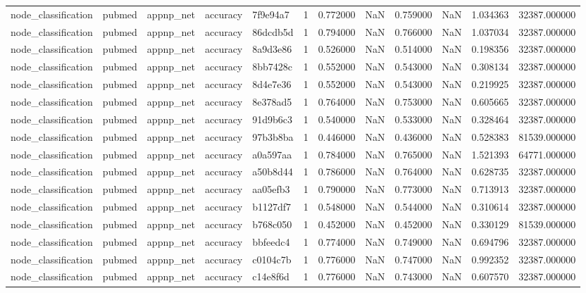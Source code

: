 \begin{tabular}{lllllrrrrrrr}
node_classification & pubmed & appnp_net & accuracy & 7f9e94a7 & 1 & 0.772000 & NaN & 0.759000 & NaN & 1.034363 & 32387.000000 \\
node_classification & pubmed & appnp_net & accuracy & 86dcdb5d & 1 & 0.794000 & NaN & 0.766000 & NaN & 1.037034 & 32387.000000 \\
node_classification & pubmed & appnp_net & accuracy & 8a9d3e86 & 1 & 0.526000 & NaN & 0.514000 & NaN & 0.198356 & 32387.000000 \\
node_classification & pubmed & appnp_net & accuracy & 8bb7428c & 1 & 0.552000 & NaN & 0.543000 & NaN & 0.308134 & 32387.000000 \\
node_classification & pubmed & appnp_net & accuracy & 8d4e7e36 & 1 & 0.552000 & NaN & 0.543000 & NaN & 0.219925 & 32387.000000 \\
node_classification & pubmed & appnp_net & accuracy & 8e378ad5 & 1 & 0.764000 & NaN & 0.753000 & NaN & 0.605665 & 32387.000000 \\
node_classification & pubmed & appnp_net & accuracy & 91d9b6c3 & 1 & 0.540000 & NaN & 0.533000 & NaN & 0.328464 & 32387.000000 \\
node_classification & pubmed & appnp_net & accuracy & 97b3b8ba & 1 & 0.446000 & NaN & 0.436000 & NaN & 0.528383 & 81539.000000 \\
node_classification & pubmed & appnp_net & accuracy & a0a597aa & 1 & 0.784000 & NaN & 0.765000 & NaN & 1.521393 & 64771.000000 \\
node_classification & pubmed & appnp_net & accuracy & a50b8d44 & 1 & 0.786000 & NaN & 0.764000 & NaN & 0.628735 & 32387.000000 \\
node_classification & pubmed & appnp_net & accuracy & aa05efb3 & 1 & 0.790000 & NaN & 0.773000 & NaN & 0.713913 & 32387.000000 \\
node_classification & pubmed & appnp_net & accuracy & b1127df7 & 1 & 0.548000 & NaN & 0.544000 & NaN & 0.310614 & 32387.000000 \\
node_classification & pubmed & appnp_net & accuracy & b768c050 & 1 & 0.452000 & NaN & 0.452000 & NaN & 0.330129 & 81539.000000 \\
node_classification & pubmed & appnp_net & accuracy & bbfeedc4 & 1 & 0.774000 & NaN & 0.749000 & NaN & 0.694796 & 32387.000000 \\
node_classification & pubmed & appnp_net & accuracy & c0104c7b & 1 & 0.776000 & NaN & 0.747000 & NaN & 0.992352 & 32387.000000 \\
node_classification & pubmed & appnp_net & accuracy & c14e8f6d & 1 & 0.776000 & NaN & 0.743000 & NaN & 0.607570 & 32387.000000 \\

\end{tabular}
